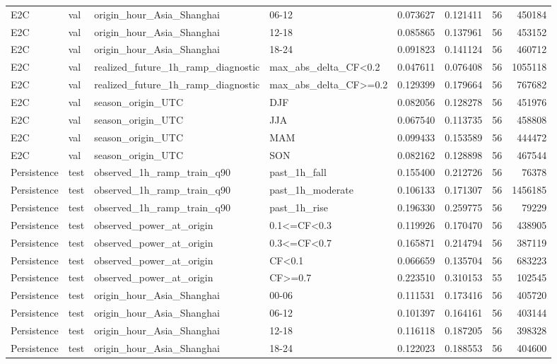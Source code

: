 \begin{tabular}{llllrrrr}
E2C & val & origin\_hour\_Asia\_Shanghai & 06-12 & 0.073627 & 0.121411 & 56 & 450184 \\
E2C & val & origin\_hour\_Asia\_Shanghai & 12-18 & 0.085865 & 0.137961 & 56 & 453152 \\
E2C & val & origin\_hour\_Asia\_Shanghai & 18-24 & 0.091823 & 0.141124 & 56 & 460712 \\
E2C & val & realized\_future\_1h\_ramp\_diagnostic & max\_abs\_delta\_CF<0.2 & 0.047611 & 0.076408 & 56 & 1055118 \\
E2C & val & realized\_future\_1h\_ramp\_diagnostic & max\_abs\_delta\_CF>=0.2 & 0.129399 & 0.179664 & 56 & 767682 \\
E2C & val & season\_origin\_UTC & DJF & 0.082056 & 0.128278 & 56 & 451976 \\
E2C & val & season\_origin\_UTC & JJA & 0.067540 & 0.113735 & 56 & 458808 \\
E2C & val & season\_origin\_UTC & MAM & 0.099433 & 0.153589 & 56 & 444472 \\
E2C & val & season\_origin\_UTC & SON & 0.082162 & 0.128898 & 56 & 467544 \\
Persistence & test & observed\_1h\_ramp\_train\_q90 & past\_1h\_fall & 0.155400 & 0.212726 & 56 & 76378 \\
Persistence & test & observed\_1h\_ramp\_train\_q90 & past\_1h\_moderate & 0.106133 & 0.171307 & 56 & 1456185 \\
Persistence & test & observed\_1h\_ramp\_train\_q90 & past\_1h\_rise & 0.196330 & 0.259775 & 56 & 79229 \\
Persistence & test & observed\_power\_at\_origin & 0.1<=CF<0.3 & 0.119926 & 0.170470 & 56 & 438905 \\
Persistence & test & observed\_power\_at\_origin & 0.3<=CF<0.7 & 0.165871 & 0.214794 & 56 & 387119 \\
Persistence & test & observed\_power\_at\_origin & CF<0.1 & 0.066659 & 0.135704 & 56 & 683223 \\
Persistence & test & observed\_power\_at\_origin & CF>=0.7 & 0.223510 & 0.310153 & 55 & 102545 \\
Persistence & test & origin\_hour\_Asia\_Shanghai & 00-06 & 0.111531 & 0.173416 & 56 & 405720 \\
Persistence & test & origin\_hour\_Asia\_Shanghai & 06-12 & 0.101397 & 0.164161 & 56 & 403144 \\
Persistence & test & origin\_hour\_Asia\_Shanghai & 12-18 & 0.116118 & 0.187205 & 56 & 398328 \\
Persistence & test & origin\_hour\_Asia\_Shanghai & 18-24 & 0.122023 & 0.188553 & 56 & 404600 \\

\end{tabular}
